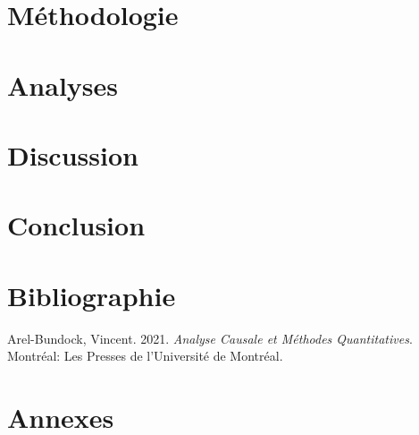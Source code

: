 \documentclass[
  12pt,
  letterpaper,
]{report}
\newlength{\cslhangindent}
\newenvironment{CSLReferences}[2] %
 {\begin{list}{}{%
  \setlength{\itemindent}{0pt}
  \setlength{\leftmargin}{0pt}
  \setlength{\parsep}{0pt}
  \ifodd #1
   \setlength{\leftmargin}{\cslhangindent}
   \setlength{\itemindent}{-1\cslhangindent}
  \fi
  \setlength{\itemsep}{#2\baselineskip}}}
 {\end{list}}
\begin{document}

\chapter{Méthodologie}\label{muxe9thodologie}


\chapter{Analyses}\label{analyses}


\chapter{Discussion}\label{discussion}


\chapter{Conclusion}\label{conclusion}


\chapter*{Bibliographie}\label{bibliographie}


\label{refs}
\begin{CSLReferences}{1}{0}
Arel-Bundock, Vincent. 2021. \emph{Analyse Causale et M{é}thodes
Quantitatives}. Montr{é}al: Les Presses de l'Universit{é} de Montr{é}al.

\end{CSLReferences}

\cleardoublepage
{}
{}
\appendix

\chapter{\texorpdfstring{{Annexes}}{Annexes}}\label{annexes-1}
\end{document}
